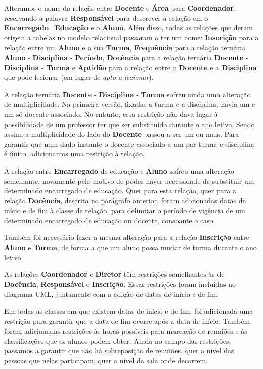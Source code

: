 \documentclass[12pt,a4paper,reqno]{report}
\numberwithin{figure}{section}
\numberwithin{equation}{section}
\begin{document}
Alteramos o nome da relação entre \textbf{Docente} e \textbf{Área} para \textbf{Coordenador}, reservando a palavra \textbf{Responsável} para descrever a relação em o \textbf{Encarregado\_Educação} e o \textbf{Aluno}. Além disso, todas as relações que deram origem a tabelas no modelo relacional passaram a ter um nome: \textbf{Inscrição} para a relação entre um \textbf{Aluno} e a sua \textbf{Turma}, \textbf{Frequência} para a relação ternária \textbf{Aluno} - \textbf{Disciplina} - \textbf{Período}, \textbf{Docência} para a relação ternária \textbf{Docente} - \textbf{Disciplina} - \textbf{Turma} e \textbf{Aptidão} para a relação entre o \textbf{Docente} e a \textbf{Disciplina} que pode lecionar (em lugar de \emph{apto a lecionar}).

A relação ternária \textbf{Docente} - \textbf{Disciplina} - \textbf{Turma} sofreu ainda uma alteração de multiplicidade. Na primeira versão, fixadas a turma e a disciplina, havia um e um só docente associado. No entanto, essa restrição não dava lugar à possibilidade de um professor ter que ser substituído durante o ano letivo. Sendo assim, a multiplicidade do lado do \textbf{Docente} passou a ser um ou mais. Para garantir que num dado instante o docente associado a um par turma e disciplina é único, adicionamos uma restrição à relação.

A relação entre \textbf{Encarregado} de educação e \textbf{Aluno} sofreu uma alteração semelhante, novamente pelo motivo de poder haver necessidade de substituir um determinado encarregado de educação. Quer para esta relação, quer para a relação \textbf{Docência}, descrita no parágrafo anterior, foram adicionadas datas de início e de fim à classe de relação, para delimitar o período de vigência de um determinado encarregado de educação ou docente, consoante o caso.

Também foi necessário fazer a mesma alteração para a relação \textbf{Inscrição} entre \textbf{Aluno} e \textbf{Turma}, de forma a que um aluno possa mudar de turma durante o ano letivo.

As relações \textbf{Coordenador} e \textbf{Diretor} têm restrições semelhantes às de \textbf{Docência}, \textbf{Responsável} e \textbf{Inscrição}. Essas restrições foram incluídas no diagrama UML, juntamente com a adição de datas de início e de fim.

Em todas as classes em que existem datas de início e de fim, foi adicionada uma restrição para garantir que a data de fim ocorre após a data de início. Também foram adicionadas restrições às horas possíveis para marcação de reuniões e às classificações que os alunos podem obter. Ainda no campo das restrições, passamos a garantir que não há sobreposição de reuniões, quer a nível das pessoas que nelas participam, quer a nível da sala onde decorrem.
\end{document}
